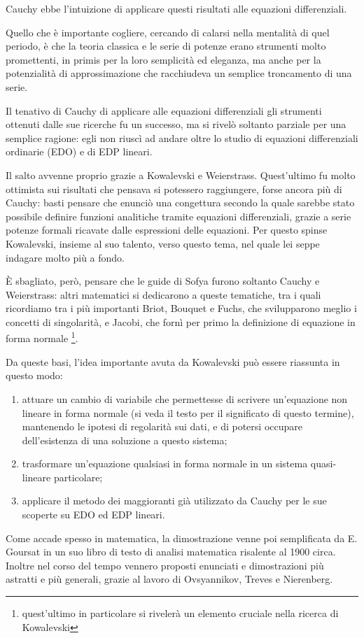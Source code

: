 Cauchy ebbe l'intuizione di applicare questi risultati alle equazioni differenziali. 

Quello che è importante cogliere, cercando di calarsi nella mentalità di quel periodo, è che la teoria classica e le serie di potenze erano strumenti molto promettenti, in primis per la loro semplicità ed eleganza, ma anche per la potenzialità di approssimazione che racchiudeva un semplice troncamento di una serie.

Il tenativo di Cauchy di applicare alle equazioni differenziali gli strumenti ottenuti dalle sue ricerche fu un successo, ma si rivelò soltanto parziale per una semplice ragione: egli non riuscì ad andare oltre lo studio di equazioni differenziali ordinarie (EDO) e di EDP lineari.

Il salto avvenne proprio grazie a Kowalevski e Weierstrass. Quest'ultimo fu molto ottimista sui risultati che pensava si potessero raggiungere, forse ancora più di Cauchy: basti pensare che enunciò una congettura secondo la quale sarebbe stato possibile definire funzioni analitiche tramite equazioni differenziali, grazie a serie potenze formali ricavate dalle espressioni delle equazioni.
Per questo spinse Kowalevski, insieme al suo talento, verso questo tema, nel quale lei seppe indagare molto più a fondo.

È sbagliato, però, pensare che le guide di Sofya furono soltanto Cauchy e Weierstrass: altri matematici si dedicarono a queste tematiche, tra i quali ricordiamo tra i più importanti Briot, Bouquet e Fuchs, che svilupparono meglio i concetti di singolarità, e Jacobi, che fornì per primo la definizione di equazione in forma normale
\footnote{quest'ultimo in particolare si rivelerà un elemento cruciale nella ricerca di Kowalevski}.

Da queste basi, l’idea importante avuta da Kowalevski può essere riassunta in questo modo: 
\begin{enumerate}
\item attuare un cambio di variabile che permettesse di scrivere un'equazione non lineare in forma normale (si veda il testo per il significato di questo termine), mantenendo le ipotesi di regolarità sui dati, e di potersi occupare dell’esistenza di una soluzione a questo sistema;
\item trasformare un'equazione qualsiasi in forma normale in un sistema quasi-lineare particolare;
\item applicare il metodo dei maggioranti già utilizzato da Cauchy per le sue scoperte su EDO ed EDP lineari.
\end{enumerate}
Come accade spesso in matematica, la dimostrazione venne poi semplificata da E. Goursat in un suo libro di testo di analisi matematica risalente al 1900 circa. Inoltre nel corso del tempo vennero proposti enunciati e dimostrazioni più astratti e più generali, grazie al lavoro di Ovsyannikov, Treves e Nierenberg.

